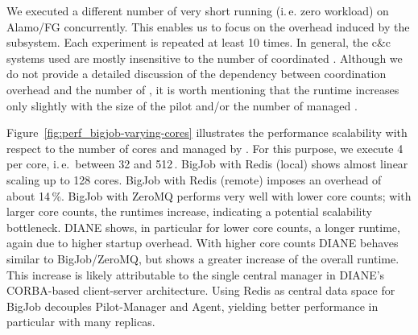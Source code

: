 \documentclass[conference]{IEEEtran}
\begin{document}




We executed a different number of very short running (i.\,e. zero workload)
\cus on Alamo/FG concurrently. 
This enables us to focus on the overhead induced by the \cc subsystem. Each
experiment is repeated at least 10 times. In general, the c\&c systems used
are mostly insensitive to the number of coordinated \cus.
Although we do not provide a detailed discussion of the dependency between 
coordination overhead and the number of \cus, it is worth mentioning that the 
runtime increases only slightly with the size of the pilot and/or the number of managed \cus.

  
Figure~\ref{fig:perf_bigjob-varying-cores} illustrates the performance
scalability with respect to the number of cores and \cus managed by \pilot. 
For this purpose,
we execute 4\,\cus per core, i.\,e.\ between 32 and 512\,\cus. BigJob with
Redis (local) shows almost linear scaling up to 128 cores. BigJob with Redis
(remote) imposes an overhead of about 14\,\%. BigJob with ZeroMQ performs very
well with lower core counts; with larger core counts, the runtimes increase,
indicating a potential scalability bottleneck. DIANE shows, in particular for
lower core counts, a longer runtime, again due to higher startup overhead.
With higher core counts DIANE behaves similar to BigJob/ZeroMQ, but shows a
greater increase of the overall runtime. This increase is likely attributable
to the single central manager in DIANE's CORBA-based client-server
architecture. Using Redis as central data space for BigJob decouples 
Pilot-Manager and Agent, yielding better performance in
particular with many replicas.
\end{document}
